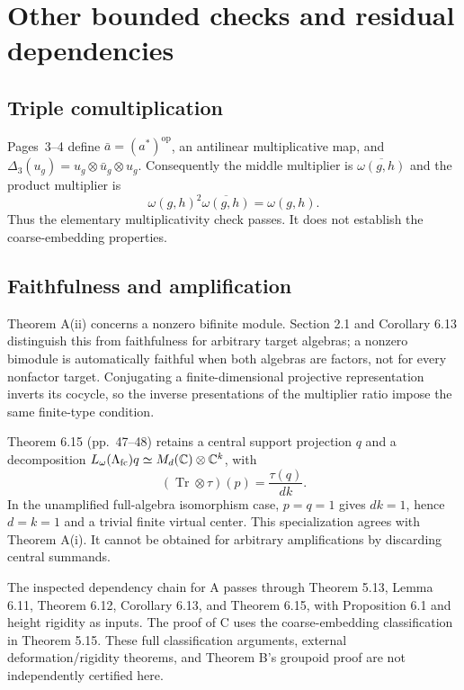 \documentclass[10pt]{article}
\begin{document}
\section*{Other bounded checks and residual dependencies}
\subsection*{Triple comultiplication}
Pages 3–4 define \(\bar a=(a^*)^{\mathrm{op}}\), an antilinear multiplicative map, and \(\Delta_3(u_g)=u_g\otimes\bar u_g\otimes u_g\). Consequently the middle multiplier is \(\overline{\omega(g,h)}\) and the product multiplier is \[\omega(g,h)^2\overline{\omega(g,h)}=\omega(g,h).\] Thus the elementary multiplicativity check passes. It does not establish the coarse-embedding properties.\par
\subsection*{Faithfulness and amplification}
Theorem A(ii) concerns a nonzero bifinite module. Section 2.1 and Corollary 6.13 distinguish this from faithfulness for arbitrary target algebras; a nonzero bimodule is automatically faithful when both algebras are factors, not for every nonfactor target. Conjugating a finite-dimensional projective representation inverts its cocycle, so the inverse presentations of the multiplier ratio impose the same finite-type condition.\par
Theorem 6.15 (pp. 47–48) retains a central support projection \(q\) and a decomposition \(L_\omega(\Lambda_{\rm fc})q\simeq M_d(\mathbb C)\otimes\mathbb C^k\), with \[(\operatorname{Tr}\otimes\tau)(p)=\frac{\tau(q)}{dk}.\] In the unamplified full-algebra isomorphism case, \(p=q=1\) gives \(dk=1\), hence \(d=k=1\) and a trivial finite virtual center. This specialization agrees with Theorem A(i). It cannot be obtained for arbitrary amplifications by discarding central summands.\par
The inspected dependency chain for A passes through Theorem 5.13, Lemma 6.11, Theorem 6.12, Corollary 6.13, and Theorem 6.15, with Proposition 6.1 and height rigidity as inputs. The proof of C uses the coarse-embedding classification in Theorem 5.15. These full classification arguments, external deformation/rigidity theorems, and Theorem B’s groupoid proof are not independently certified here.\par
\end{document}
